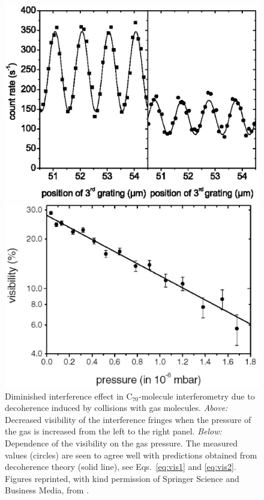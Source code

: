 \documentclass[12pt,aps,floatfix,amsmath,amssymb,showpacs,nofootinbib]{revtex4-2}
\begin{document}
\begin{figure}
\begin{center}
  \includegraphics[scale=.37]{c70-dec-n.eps}

\vspace{.5cm}

  \includegraphics[scale=.37]{c70-vis-n.eps}
\end{center}
\caption[Diminished interference effect in
C$_{70}$-molecule interferometry due to collisional
decoherence]{\label{fig:c70-dec} Diminished interference effect in
  C$_{70}$-molecule interferometry due to decoherence induced by
  collisions with gas molecules. {\em Above:} Decreased visibility of
  the interference fringes when the pressure of the gas is increased
  from the left to the right panel. {\em Below:} Dependence of the
  visibility on the gas pressure. The measured values (circles) are
  seen to agree well with predictions obtained from decoherence theory
  (solid line), see Eqs.~\eqref{eq:vis1} and \eqref{eq:vis2}. Figures
  reprinted, with kind permission of Springer Science and Business
  Media, from \cite{Hackermuller:2003:uu}.}
\end{figure}
\end{document}
